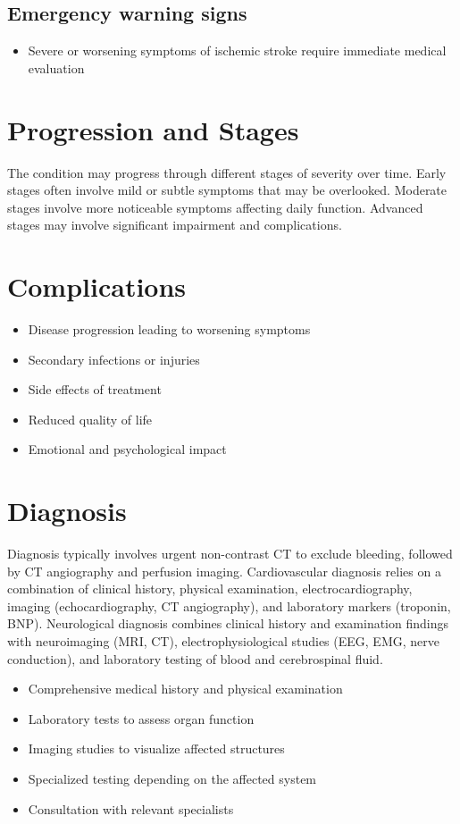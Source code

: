 \subsection{Emergency warning signs}
\begin{itemize}[noitemsep]
  \item Severe or worsening symptoms of ischemic stroke require immediate medical evaluation
\end{itemize}
\section{Progression and Stages}
The condition may progress through different stages of severity over time. Early stages often involve mild or subtle symptoms that may be overlooked. Moderate stages involve more noticeable symptoms affecting daily function. Advanced stages may involve significant impairment and complications.
\section{Complications}
\begin{itemize}[noitemsep]
  \item Disease progression leading to worsening symptoms
  \item Secondary infections or injuries
  \item Side effects of treatment
  \item Reduced quality of life
  \item Emotional and psychological impact
\end{itemize}
\section{Diagnosis}
Diagnosis typically involves urgent non-contrast CT to exclude bleeding, followed by CT angiography and perfusion imaging. Cardiovascular diagnosis relies on a combination of clinical history, physical examination, electrocardiography, imaging (echocardiography, CT angiography), and laboratory markers (troponin, BNP). Neurological diagnosis combines clinical history and examination findings with neuroimaging (MRI, CT), electrophysiological studies (EEG, EMG, nerve conduction), and laboratory testing of blood and cerebrospinal fluid.

\begin{itemize}[noitemsep]
  \item Comprehensive medical history and physical examination
  \item Laboratory tests to assess organ function
  \item Imaging studies to visualize affected structures
  \item Specialized testing depending on the affected system
  \item Consultation with relevant specialists
\end{itemize}
